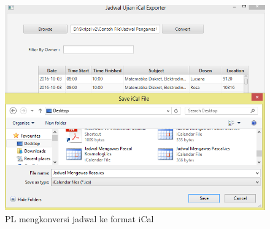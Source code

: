 \begin{enumerate}
\begin{figure}[H]
		\includegraphics[scale=0.6]{Gambar/konversiiCalEksperimental}
		\caption{PL mengkonversi jadwal ke format iCal}
		\label{fig:konversiiCalEksperimental}
		\end{figure}
		

\end{enumerate}
